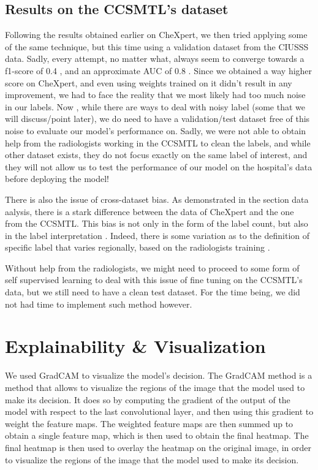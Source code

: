 \documentclass[11pt]{article}
\begin{document}
        \subsection{Results on the CCSMTL's dataset}


            Following the results obtained earlier on CheXpert, we then tried applying some of the same technique, but this time using a validation dataset from the CIUSSS data. Sadly, every attempt, no matter what, always seem
            to converge towards a f1-score of 0.4 , and an approximate AUC of 0.8 . Since we obtained a way higher score on CheXpert, and even using weights trained on it didn't result in any improvement, we had to face
            the reality that we most likely had too much noise in our labels. Now , while there are ways to deal with noisy label (some that we will discuss/point later), we do need to have a validation/test dataset free
            of this noise to evaluate our model's performance on. Sadly, we were not able to obtain help from the radiologists working in the CCSMTL to clean the labels, and while other dataset exists, they do not focus
            exactly on the same label of interest, and they will not allow us to test the performance of our model on the hospital's data before deploying the model!

            There is also the issue of cross-dataset bias. As demonstrated in the section data aalysis, there is a stark difference between the data of CheXpert and the one from the CCSMTL. This bias is not only in the form of the
            label count, but also in the label interpretation . Indeed, there is some variation as to the definition of specific label that varies regionally, based on the radiologists training \cite{cross-bias}.

            Without help from the radiologists, we might need to proceed to some form of self supervised learning to deal with this issue of fine tuning on the CCSMTL's data, but we still need to have a clean test dataset. For the time being, we did not had time to implement such method however.



    \section{Explainability \& Visualization}

        We used GradCAM \cite{gradcam} to visualize the model's decision. The GradCAM method is a method that allows to visualize the regions of the image that the model used to make its decision. It does so by computing the gradient of the output of the model with respect to the last convolutional layer, and then using this gradient to weight the feature maps.
        The weighted feature maps are then summed up to obtain a single feature map, which is then used to obtain the final heatmap.
        The final heatmap is then used to overlay the heatmap on the original image, in order to visualize the regions of the image that the model used to make its decision.
\end{document}
